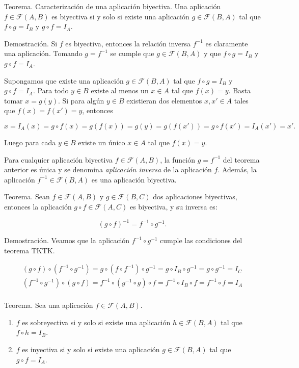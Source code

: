 Teorema. Caracterización de una aplicación biyectiva. Una aplicación $f \in
\mathcal{F}(A, B)$ es biyectiva si y solo si existe una aplicación $g \in
\mathcal{F}(B, A)$ tal que $f \circ g = I_B$ y $g \circ f = I_A$.

Demostración. Si $f$ es biyectiva, entonces la relación inversa $f^{-1}$ es
claramente una aplicación. Tomando $g = f^{-1}$ se cumple que $g \in
\mathcal{F}(B, A)$ y que $f \circ g = I_B$ y $g \circ f = I_A$.

Supongamos que existe una aplicación $g \in \mathcal{F}(B, A)$ tal que $f
\circ g = I_B$ y $g \circ f = I_A$. Para todo $y \in B$ existe al menos un
$x \in A$ tal que $f(x) = y$. Basta tomar $x = g(y)$. Si para algún $y \in
B$ existieran dos elementos $x, x' \in A$ tales que $f(x) = f(x') = y$,
entonces

$$ x = I_A(x) = g \circ f(x) = g(f(x)) = g(y) = g(f(x')) = g \circ f(x') =
I_A(x') = x'. $$

Luego para cada $y \in B$ existe un único $x \in A$ tal que $f(x) = y$.

Para cualquier aplicación biyectiva $f \in \mathcal{F}(A, B)$, la función $g
= f^{-1}$ del teorema anterior es única y se denomina \emph{aplicación
inversa} de la aplicación $f$. Además, la aplicación $f^{-1} \in
\mathcal{F}(B, A)$ es una aplicación biyectiva.

Teorema. Sean $f \in \mathcal{F}(A, B)$ y $g \in \mathcal{F}(B, C)$ dos
aplicaciones biyectivas, entonces la aplicación $g \circ f \in
\mathcal{F}(A, C)$ es biyectiva, y su inversa es:

$$ (g \circ f)^{-1} = f^{-1} \circ g^{-1}. $$

Demostración. Veamos que la aplicación $f^{-1} \circ g^{-1}$ cumple las
condiciones del teorema TKTK.

\begin{align*}
  (g \circ f) \circ (f^{-1} \circ g^{-1}) = g \circ (f \circ f^{-1}) \circ
    g^{-1} = g \circ I_B \circ g^{-1} = g \circ g^{-1} = I_C \\
  (f^{-1} \circ g^{-1}) \circ (g \circ f) = f^{-1} \circ (g^{-1} \circ g)
    \circ f = f^{-1} \circ I_B \circ f = f^{-1} \circ f = I_A \\
\end{align*}

Teorema. Sea una aplicación $f \in \mathcal{F}(A, B)$.

\begin{enumerate}
  \item $f$ es sobreyectiva si y solo si existe una aplicación $h \in
    \mathcal{F}(B, A)$ tal que $f \circ h = I_B$.
  \item $f$ es inyectiva si y solo si existe una aplicación $g \in
    \mathcal{F}(B, A)$ tal que $g \circ f = I_A$.
\end{enumerate}

